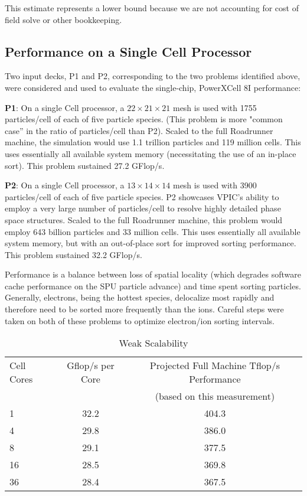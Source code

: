 \documentclass[letter,10pt]{article}
\begin{document}
This estimate represents a lower bound because we are not accounting
for cost of field solve or other bookkeeping. 

\subsection{Performance on a Single Cell Processor}

Two input decks,  P1 and P2, corresponding to the two problems 
identified above, were considered and used to evaluate the single-chip, 
PowerXCell 8I performance: 

\textbf{P1}:  On a single Cell processor, a $22 \times 21 \times 21$ mesh 
is used with 1755 particles/cell of each of five particle species.  
(This problem is 
more "common case'' 
in the ratio of particles/cell than P2).  
Scaled to the full Roadrunner machine, the simulation would 
use 1.1 trillion particles and 119 million cells.  This uses essentially
all available system memory (necessitating the use of an in-place sort). 
This problem sustained 27.2 GFlop/s. 


\textbf{P2}:  On a single Cell processor, a $13 \times 14 \times 14$ mesh 
is used with 3900 particles/cell of each of five particle species.  
P2 showcases VPIC's ability to employ a very large number of particles/cell 
to resolve highly detailed phase space structures.  
Scaled to the full Roadrunner machine, this problem would employ 
643 billion particles and 33 million cells. This uses essentially
all available system memory, but with an out-of-place sort for improved 
sorting performance. 
This problem sustained 32.2 GFlop/s. 

Performance is a balance between loss of spatial locality (which degrades
software cache performance on the SPU particle advance) and time spent
sorting particles.  Generally, electrons, being the hottest species, 
delocalize most rapidly and therefore need to be sorted more
frequently than the ions.  Careful steps were taken on both of these
problems to optimize electron/ion sorting intervals. 

\begin{table}
\caption{\label{tbl:ASDS_Weak_Scalability}
Weak Scalability}

\begin{center}
\begin{tabular}{l c c}
\hline
\hline
Cell Cores & Gflop/s per Core & Projected Full Machine Tflop/s Performance \\
 & & (based on this measurement) \\
\hline
1 & 32.2 & 404.3 \\
4 & 29.8 & 386.0 \\
8 & 29.1 & 377.5 \\
16 & 28.5 & 369.8 \\
36 & 28.4 & 367.5 \\
\hline
\end{tabular}
\end{center}
\end{table}
\end{document}
